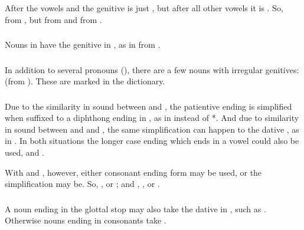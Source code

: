 \subsubsection{} After the vowels  and  the genitive is just
, but after all other vowels it is .  So, 
from , but  from  and 
from .

\subsubsection{} Nouns in  have the genitive in , as in
 from .

\subsubsection{} In addition to several pronouns
(), there are a few nouns with
irregular genitives:  (from ).  These are
marked in the dictionary.

\subsubsection{} Due to the similarity in sound between  and
, the patientive ending  is simplified when suffixed to a
diphthong ending in , as in   instead of
*.  And due to similarity in sound between  and and
, the same simplification can happen to the dative , as in
 .  In both situations the longer case
ending which ends in a vowel could also be used, 
and . 

With  and , however, either consonant ending form may be
used, or the simplification may be.  So, , 
or ; and , , or .

\subsubsection{} A noun ending in the glottal stop may also take the
dative in , such as .  Otherwise
nouns ending in consonants take .

